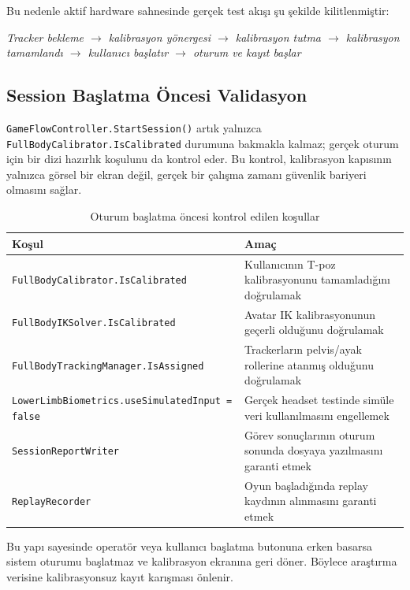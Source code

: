 \documentclass[11pt,a4paper]{article}
\begin{document}
Bu nedenle aktif hardware sahnesinde gerçek test akışı şu şekilde
kilitlenmiştir:

\begin{center}
\textit{Tracker bekleme $\rightarrow$ kalibrasyon yönergesi $\rightarrow$
kalibrasyon tutma $\rightarrow$ kalibrasyon tamamlandı $\rightarrow$
kullanıcı başlatır $\rightarrow$ oturum ve kayıt başlar}
\end{center}

\subsection{Session Başlatma Öncesi Validasyon}

\texttt{GameFlowController.StartSession()} artık yalnızca
\texttt{FullBodyCalibrator.IsCalibrated} durumuna bakmakla kalmaz; gerçek
oturum için bir dizi hazırlık koşulunu da kontrol eder. Bu kontrol,
kalibrasyon kapısının yalnızca görsel bir ekran değil, gerçek bir çalışma
zamanı güvenlik bariyeri olmasını sağlar.

\begin{table}[H]
\centering
\caption{Oturum başlatma öncesi kontrol edilen koşullar}
\label{tab:session_gate}
\renewcommand{\arraystretch}{1.22}
\begin{tabularx}{\textwidth}{lX}
\toprule
\textbf{Koşul} & \textbf{Amaç} \\
\midrule
\texttt{FullBodyCalibrator.IsCalibrated} & Kullanıcının T-poz kalibrasyonunu tamamladığını doğrulamak \\
\texttt{FullBodyIKSolver.IsCalibrated} & Avatar IK kalibrasyonunun geçerli olduğunu doğrulamak \\
\texttt{FullBodyTrackingManager.IsAssigned} & Trackerların pelvis/ayak rollerine atanmış olduğunu doğrulamak \\
\texttt{LowerLimbBiometrics.useSimulatedInput = false} & Gerçek headset testinde simüle veri kullanılmasını engellemek \\
\texttt{SessionReportWriter} & Görev sonuçlarının oturum sonunda dosyaya yazılmasını garanti etmek \\
\texttt{ReplayRecorder} & Oyun başladığında replay kaydının alınmasını garanti etmek \\
\bottomrule
\end{tabularx}
\end{table}

Bu yapı sayesinde operatör veya kullanıcı başlatma butonuna erken basarsa
sistem oturumu başlatmaz ve kalibrasyon ekranına geri döner. Böylece
araştırma verisine kalibrasyonsuz kayıt karışması önlenir.
\end{document}
